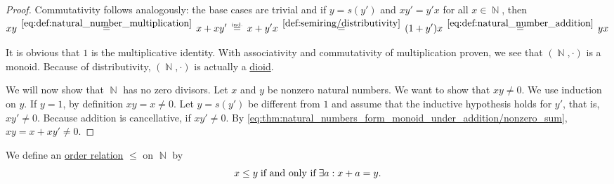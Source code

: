 \begin{proof}
   Commutativity follows analogously: the base cases are trivial and if \( y = s(y') \) and \( xy' = y'x \) for all \( x \in \BbbN \), then
  \begin{equation*}
    xy
    \reloset{\eqref{eq:def:natural_number_multiplication}} =
    x + xy'
    \reloset {\T{ind.}} =
    x + y'x
    \reloset{\eqref{def:semiring/distributivity}} =
    (1 + y') x
    \reloset{\eqref{eq:def:natural_number_addition}} =
    yx
  \end{equation*}

   It is obvious that \( 1 \) is the multiplicative identity. With associativity and commutativity of multiplication proven, we see that \( (\BbbN, \cdot) \) is a monoid. Because of distributivity, \( (\BbbN, \cdot) \) is actually a \hyperref[def:semiring/dioid]{dioid}.

  We will now show that \( \BbbN \) has no zero divisors. Let \( x \) and \( y \) be nonzero natural numbers. We want to show that \( xy \neq 0 \). We use induction on \( y \). If \( y = 1 \), by definition \( xy = x \neq 0 \). Let \( y = s(y') \) be different from \( 1 \) and assume that the inductive hypothesis holds for \( y' \), that is, \( xy' \neq 0 \). Because addition is cancellative, if \( xy' \neq 0 \). By \eqref{eq:thm:natural_numbers_form_monoid_under_addition/nonzero_sum}, \( xy = x + xy' \neq 0 \).
\end{proof}

\begin{definition}\label{def:natural_number_ordering}
  We define an \hyperref[def:preordered_set]{order relation} \( \leq \) on \( \BbbN \) by
  \begin{equation*}
    x \leq y \T{if and only if} \exists a: x + a = y.
  \end{equation*}
\end{definition}

